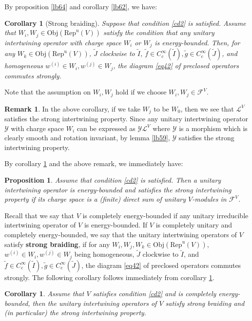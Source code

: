 \documentclass[12pt,a4paper]{article}
\theoremstyle{definition}
\newtheorem{rem}[df]{Remark}
\theoremstyle{plain}
\newtheorem{pp}[df]{Proposition}
\newtheorem{co}[df]{Corollary}
\newcommand{\mc}{\mathcal}
\newcommand{\wtd}{\widetilde}
\newcommand{\RepuV}{\mathrm{Rep}^{\mathrm u}(V)}
\newcommand{\Obj}{\mathrm{Obj}}
\numberwithin{equation}{subsection}
\begin{document}
By proposition \ref{lb64} and corollary \ref{lb62}, we have:

\begin{co}[Strong braiding]\label{lb65}
Suppose that condition \ref{cd2} is satisfied. Assume that  $W_i,W_j\in\Obj(\RepuV)$ satisfy the condition that any  unitary intertwining operator with charge space $W_i$ or $W_j$ is energy-bounded.  Then, for any $W_k\in\Obj(\RepuV)$, $\wtd J$ clockwise to $\wtd I$, $\wtd f\in C_c^\infty(\wtd I),\wtd g\in C_c^\infty(\wtd J)$, and homogeneous $w^{(i)}\in W_i,w^{(j)}\in W_j$, the diagram \eqref{eq42} of preclosed operators commutes strongly.
\end{co}

Note that the assumption on $W_i,W_j$ hold if we choose $W_i,W_j\in\mc F^V$.

\begin{rem}\label{lb72}
In the above corollary, if we take $W_j$ to be $W_0$, then we see that $\mc L^V$ satisfies the strong intertwining property. Since any unitary intertwining operator $\mc Y$ with charge space $W_i$ can be expressed as $\mc Y\mc L^V$ where $\mc Y$ is a morphism which is clearly smooth and rotation invariant, by lemma \ref{lb59}, $\mc Y$ satisfies the strong intertwining property. 
\end{rem}

By corollary \ref{lb65} and the above remark, we immediately have:

\begin{pp}\label{lb88}
Assume that condition \ref{cd2} is satisfied. Then  a unitary intertwining operator is energy-bounded and satisfies the strong intertwining property if its charge space is a (finite) direct sum of unitary $V$-modules in $\mc F^V$.
\end{pp}



Recall that we say that $V$ is completely energy-bounded if any  unitary irreducible intertwining operator of $V$ is energy-bounded. If $V$ is completely unitary and completely energy-bounded, we say that the unitary intertwining operators of $V$ satisfy \textbf{strong braiding}, if for any $W_i,W_j,W_k\in\Obj(\RepuV)$, $w^{(i)}\in W_i,w^{(j)}\in W_j$ being homogeneous, $\wtd J$ clockwise to $\wtd I$, and $\wtd f\in C_c^\infty(\wtd I),\wtd g\in C_c^\infty(\wtd J)$, the diagram \eqref{eq42} of preclosed operators commutes strongly. The following corollary follows immediately from corollary \ref{lb65}.

\begin{co}\label{lb80}
Assume that $V$ satisfies condition \ref{cd2} and is completely energy-bounded, then the unitary intertwining operators of $V$ satisfy strong braiding and (in particular) the strong intertwining property.
\end{co}
\end{document}
